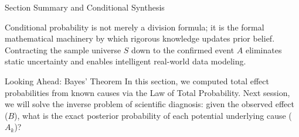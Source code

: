 \documentclass[10pt,aspectratio=169]{beamer}
\begin{document}
\begin{frame}{Section Summary and Conditional Synthesis}
  \begin{reflection}
    Conditional probability is not merely a division formula; it is the formal mathematical machinery by which rigorous knowledge updates prior belief. Contracting the sample universe $S$ down to the confirmed event $A$ eliminates static uncertainty and enables intelligent real-world data modeling.
  \end{reflection}

  \vspace{0.5em}
  \pause
  \begin{block}{Looking Ahead: Bayes' Theorem}
    In this section, we computed total effect probabilities from known causes via the Law of Total Probability. Next session, we will solve the inverse problem of scientific diagnosis: given the observed effect ($B$), what is the exact posterior probability of each potential underlying cause ($A_k$)?
  \end{block}
\end{frame}
\end{document}
